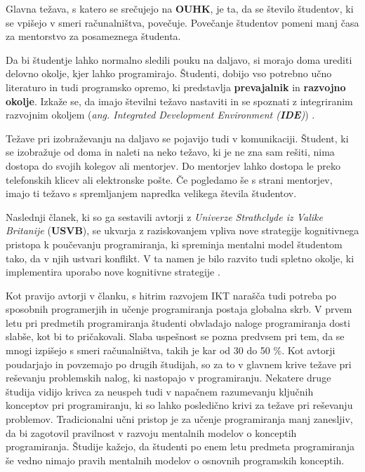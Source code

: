 Glavna težava, s katero se srečujejo na \textbf{OUHK}, je ta, da se
število študentov, ki se vpišejo v smeri računalništva,
povečuje. Povečanje študentov pomeni manj časa za mentorstvo za
posameznega študenta.

Da bi študentje lahko normalno sledili pouku na daljavo, si morajo
doma urediti delovno okolje, kjer lahko programirajo. Študenti,
dobijo vso potrebno učno literaturo in tudi programsko opremo, ki
predstavlja \textbf{prevajalnik} in \textbf{razvojno okolje}. Izkaže se,
da imajo številni težavo nastaviti in se spoznati z integriranim
razvojnim okoljem (\emph{ang. Integrated Development Environment
  (\textbf{IDE})}) \cite{ITaLCP_DistanceEdu}.

Težave pri izobraževanju na daljavo se pojavijo tudi v
komunikaciji. Študent, ki se izobražuje od doma in naleti na neko
težavo, ki je ne zna sam rešiti, nima dostopa do svojih kolegov ali
mentorjev. Do mentorjev lahko dostopa le preko telefonskih klicev ali
elektronske pošte. Če pogledamo še s strani mentorjev, imajo ti težavo
s spremljanjem napredka velikega števila študentov.


Naslednji članek, ki so ga sestavili avtorji z \emph{Univerze
  Strathclyde iz Valike Britanije} (\textbf{USVB}), se ukvarja z
raziskovanjem vpliva nove strategije kognitivnega pristopa k
poučevanju programiranja, ki spreminja mentalni model študentom tako,
da v njih ustvari konflikt. V ta namen je bilo razvito tudi spletno
okolje, ki implementira uporabo nove kognitivne strategije
\cite{mentalModels}.


Kot pravijo avtorji v članku, s hitrim razvojem IKT narašča tudi
potreba po sposobnih programerjih in učenje programiranja postaja
globalna skrb. V prvem letu pri predmetih programiranja študenti
obvladajo naloge programiranja dosti slabše, kot bi to
pričakovali. Slaba uspešnost se pozna predvsem pri tem, da se mnogi
izpišejo s smeri računalništva, takih je kar od 30 do 50 \%. Kot
avtorji poudarjajo in povzemajo po drugih študijah, so za to v glavnem
krive težave pri reševanju problemskih nalog, ki nastopajo v
programiranju. Nekatere druge študija vidijo krivca za neuspeh tudi v
napačnem razumevanju ključnih konceptov pri programiranju, ki so lahko
posledično krivi za težave pri reševanju problemov. Tradicionalni učni
pristop je za učenje programiranja manj zanesljiv, da bi zagotovil
pravilnost v razvoju mentalnih modelov o konceptih
programiranja. Študije kažejo, da študenti po enem letu predmeta
programiranja še vedno nimajo pravih mentalnih modelov o osnovnih
programskih konceptih.


